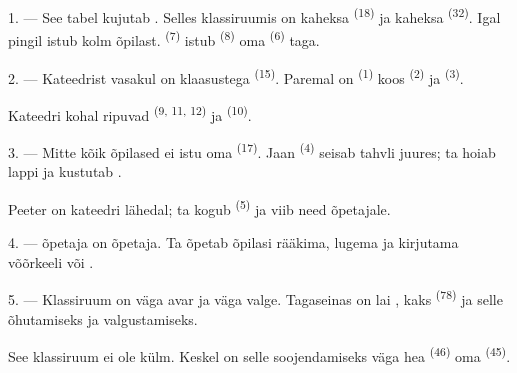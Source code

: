 \VUsaut{2.0mm}
\VUsaut{3.2mm}
\VUsaut{2.6mm}
\VUsaut{3.4mm}
\VUornamento{9pt}
\VUsaut{5.0mm}
\VUsaut{3.0mm}
\VUfilet{16mm}
\VUsaut{5.6mm}

\VUsaut{1.4mm}
\VUsaut{2.2mm}
\VUfilet{20mm}
\VUsaut{6.4mm}

\VUsaut{3.0mm}

1. --- See tabel kujutab  . Selles
klassiruumis on kaheksa  \textsuperscript{(18)} ja kaheksa
 \textsuperscript{(32)}. Igal pingil istub kolm õpilast.
 \textsuperscript{(7)} istub  \textsuperscript{(8)} oma
 \textsuperscript{(6)} taga.

2. --- Kateedrist vasakul on  klaasustega \textsuperscript{(15)}. Paremal
on  \textsuperscript{(1)} koos  \textsuperscript{(2)} ja
 \textsuperscript{(3)}.

Kateedri kohal ripuvad  \textsuperscript{(9, 11, 12)} ja
 \textsuperscript{(10)}.

3. --- Mitte kõik õpilased ei istu oma  \textsuperscript{(17)}. Jaan
\textsuperscript{(4)} seisab tahvli juures; ta hoiab lappi ja kustutab
.

Peeter on kateedri lähedal; ta kogub  \textsuperscript{(5)} ja
viib need õpetajale.

4. ---  õpetaja on  õpetaja. Ta õpetab õpilasi
rääkima, lugema ja kirjutama võõrkeeli  või .

5. --- Klassiruum on väga avar ja väga valge. Tagaseinas on lai , kaks
 \textsuperscript{(78)} ja  selle õhutamiseks ja
valgustamiseks.

See klassiruum ei ole külm. Keskel on selle soojendamiseks väga hea 
\textsuperscript{(46)} oma  \textsuperscript{(45)}.

